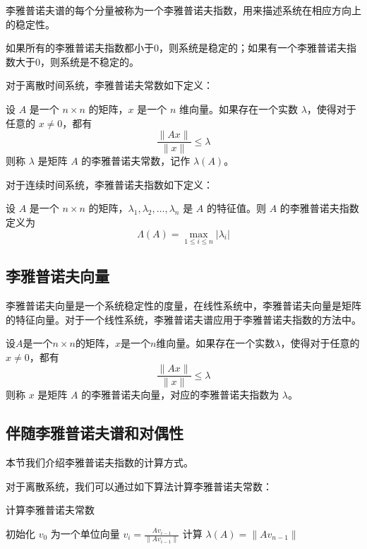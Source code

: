 \documentclass[12pt,a4paper]{amsart}
\begin{document}
李雅普诺夫谱的每个分量被称为一个李雅普诺夫指数，用来描述系统在相应方向上的稳定性。

如果所有的李雅普诺夫指数都小于0，则系统是稳定的；如果有一个李雅普诺夫指数大于0，则系统是不稳定的。

对于离散时间系统，李雅普诺夫常数如下定义：

\begin{definition}
设 $A$ 是一个 $n\times n$ 的矩阵，$x$ 是一个 $n$ 维向量。如果存在一个实数 $\lambda$，使得对于任意的 $x\neq 0$，都有
\[
\frac{\|Ax\|}{\|x\|}\leq \lambda
\]
则称 $\lambda$ 是矩阵 $A$ 的李雅普诺夫常数，记作 $\lambda(A)$。
\end{definition}

对于连续时间系统，李雅普诺夫指数如下定义：

\begin{definition}
设 $A$ 是一个 $n\times n$ 的矩阵，$\lambda_1,\lambda_2,\ldots,\lambda_n$ 是 $A$ 的特征值。则 $A$ 的李雅普诺夫指数定义为
\[
\Lambda(A)=\max_{1\leq i\leq n}|\lambda_i|
\]
\end{definition}

\subsection{李雅普诺夫向量}

李雅普诺夫向量是一个系统稳定性的度量，在线性系统中，李雅普诺夫向量是矩阵的特征向量。对于一个线性系统，李雅普诺夫谱应用于李雅普诺夫指数的方法中。

\begin{definition}[李雅普诺夫向量]
设$A$是一个$n\times n$的矩阵，$x$是一个$n$维向量。如果存在一个实数$\lambda$，使得对于任意的$x\neq 0$，都有
\[
\frac{\|Ax\|}{\|x\|}\leq \lambda
\]
则称 $x$ 是矩阵 $A$ 的李雅普诺夫向量，对应的李雅普诺夫指数为 $\lambda$。
\end{definition}

\subsection{伴随李雅普诺夫谱和对偶性}

本节我们介绍李雅普诺夫指数的计算方式。

对于离散系统，我们可以通过如下算法计算李雅普诺夫常数：

\begin{algorithm}[htbp]
\caption{计算李雅普诺夫常数}
\begin{algorithmic}[1]
\State 初始化 $v_0$ 为一个单位向量
\State $v_i = \frac{Av_{i-1}}{\|Av_{i-1}\|}$
\EndFor
\State 计算 $\lambda(A)=\|Av_{n-1}\|$
\end{algorithmic}
\end{algorithm}
\end{document}
